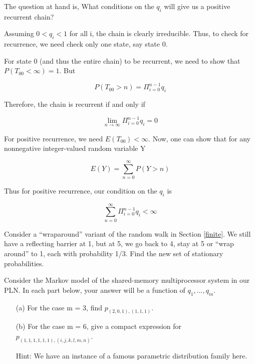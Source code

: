The question at hand is, What conditions on the $q_{i}$ will give us
a positive recurrent chain?

Assuming $0<q_{i}<1$ for all i, the chain is clearly irreducible.
Thus, to check for recurrence, we need check only one state, say state
0.

For state 0 (and thus the entire chain) to be recurrent, we need to show
that $P(T_{00}<\infty )=1$. But

\begin{equation}
P(T_{00}>n)=\Pi_{i=0}^{n-1}q_{i}
\end{equation}

Therefore, the chain is recurrent if and only if 

\begin{equation}
\lim_{n\rightarrow \infty }\Pi_{i=0}^{n-1}q_{i}=0
\end{equation}

For positive recurrence, we need $E(T_{00})<\infty$. Now, one can show
that for any nonnegative integer-valued random variable Y

\begin{equation}
E(Y)=\sum ^{\infty }_{n=0}P(Y>n)
\end{equation}

Thus for positive recurrence, our condition on the $q_i$ is

\begin{equation}
\sum ^{\infty }_{n=0}\Pi ^{n-1}_{i=0}q_{i}<\infty 
\end{equation} 

\startproblemset

\oneproblem
Consider a ``wraparound'' variant of the random walk in Section
\ref{finite}.  We still have a reflecting barrier at 1, but at 5, we go
back to 4, stay at 5 or ``wrap around'' to 1, each with probability 1/3.
Find the new set of stationary probabilities.

\oneproblem
Consider the Markov model of the shared-memory multiprocessor system 
in our PLN.  In each part below, your answer will be a function of 
$q_1,...,q_m$.

\begin{itemize}

\item [(a)] For the case m = 3, find $p_{(2,0,1),(1,1,1)}$.

\item [(b)] For the case m = 6, give a compact expression for
$p_{(1,1,1,1,1,1),(i,j,k,l,m,n)}$.

Hint:  We have an instance of a famous parametric distribution family here.

\end{itemize}

